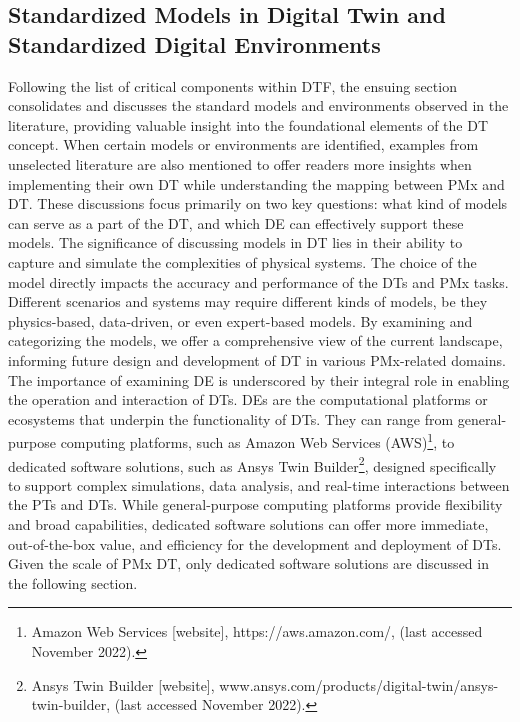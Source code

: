 \documentclass[runningheads]{llncs}
\begin{document}
\subsection{Standardized Models in Digital Twin and Standardized Digital Environments} \label{m&e}
Following the list of critical components within DTF, the ensuing section consolidates and discusses the standard models and environments observed in the literature, providing valuable insight into the foundational elements of the DT concept. When certain models or environments are identified, examples from unselected literature are also mentioned to offer readers more insights when implementing their own DT while understanding the mapping between PMx and DT. These discussions focus primarily on two key questions: what kind of models can serve as a part of the DT, and which DE can effectively support these models. The significance of discussing models in DT lies in their ability to capture and simulate the complexities of physical systems. The choice of the model directly impacts the accuracy and performance of the DTs and PMx tasks. Different scenarios and systems may require different kinds of models, be they physics-based, data-driven, or even expert-based models. By examining and categorizing the models, we offer a comprehensive view of the current landscape, informing future design and development of DT in various PMx-related domains. The importance of examining DE is underscored by their integral role in enabling the operation and interaction of DTs. DEs are the computational platforms or ecosystems that underpin the functionality of DTs. They can range from general-purpose computing platforms, such as Amazon Web Services (AWS)\footnote{Amazon Web Services [website], https://aws.amazon.com/, (last accessed November 2022).}, to dedicated software solutions, such as Ansys Twin Builder\footnote{Ansys Twin Builder [website], www.ansys.com/products/digital-twin/ansys-twin-builder, (last accessed November 2022).}, designed specifically to support complex simulations, data analysis, and real-time interactions between the PTs and DTs. While general-purpose computing platforms provide flexibility and broad capabilities, dedicated software solutions can offer more immediate, out-of-the-box value, and efficiency for the development and deployment of DTs. Given the scale of PMx DT, only dedicated software solutions are discussed in the following section.
\end{document}
